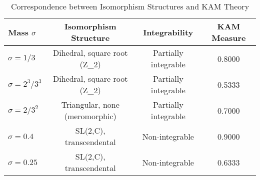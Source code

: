 \begin{table}[htbp]
\centering
\caption{Correspondence between Isomorphism Structures and KAM Theory}
\label{tab:isomorphism_kam}
\begin{tabular}{lccc}
\toprule
Mass $\sigma$ & Isomorphism Structure & Integrability & KAM Measure \\
\midrule
$\sigma = 1/3$ & Dihedral, square root (Z_2) & Partially integrable & 0.8000 \\
$\sigma = 2^3/3^3$ & Dihedral, square root (Z_2) & Partially integrable & 0.5333 \\
$\sigma = 2/3^2$ & Triangular, none (meromorphic) & Partially integrable & 0.7000 \\
$\sigma = 0.4$ & SL(2,C), transcendental & Non-integrable & 0.9000 \\
$\sigma = 0.25$ & SL(2,C), transcendental & Non-integrable & 0.6333 \\
\bottomrule
\end{tabular}
\end{table}
